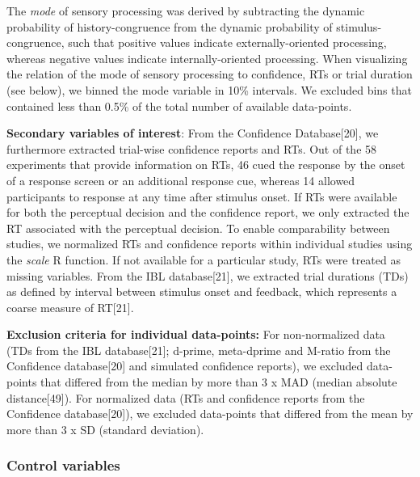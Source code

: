 \documentclass[
]{article}
\begin{document}
The \emph{mode} of sensory processing was derived by subtracting the
dynamic probability of history-congruence from the dynamic probability
of stimulus-congruence, such that positive values indicate
externally-oriented processing, whereas negative values indicate
internally-oriented processing. When visualizing the relation of the
mode of sensory processing to confidence, RTs or trial duration (see
below), we binned the mode variable in 10\% intervals. We excluded bins
that contained less than 0.5\% of the total number of available
data-points.

\textbf{Secondary variables of interest}: From the Confidence
Database{[}20{]}, we furthermore extracted trial-wise confidence reports
and RTs. Out of the 58 experiments that provide information on RTs, 46
cued the response by the onset of a response screen or an additional
response cue, whereas 14 allowed participants to response at any time
after stimulus onset. If RTs were available for both the perceptual
decision and the confidence report, we only extracted the RT associated
with the perceptual decision. To enable comparability between studies,
we normalized RTs and confidence reports within individual studies using
the \emph{scale} R function. If not available for a particular study,
RTs were treated as missing variables. From the IBL database{[}21{]}, we
extracted trial durations (TDs) as defined by interval between stimulus
onset and feedback, which represents a coarse measure of RT{[}21{]}.

\textbf{Exclusion criteria for individual data-points:} For
non-normalized data (TDs from the IBL database{[}21{]}; d-prime,
meta-dprime and M-ratio from the Confidence database{[}20{]} and
simulated confidence reports), we excluded data-points that differed
from the median by more than 3 x MAD (median absolute distance{[}49{]}).
For normalized data (RTs and confidence reports from the Confidence
database{[}20{]}), we excluded data-points that differed from the mean
by more than 3 x SD (standard deviation).

\hypertarget{control-variables}{%
\subsubsection{Control variables}\label{control-variables}}
\end{document}
